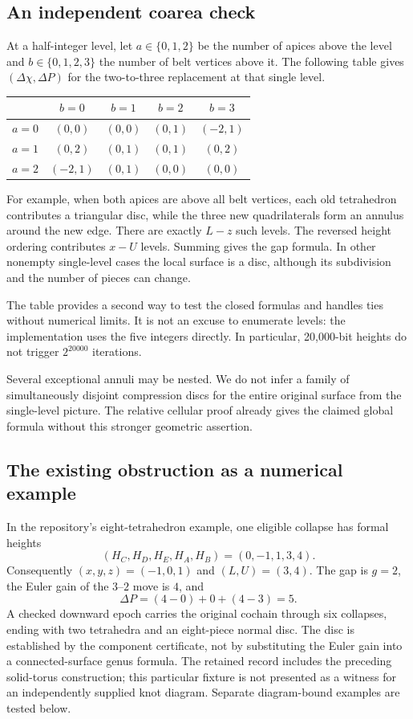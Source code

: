 \documentclass[11pt,letterpaper]{article}
\theoremstyle{definition}
\theoremstyle{remark}
\begin{document}
\subsection{An independent coarea check}

At a half-integer level, let $a\in\{0,1,2\}$ be the number of apices
above the level and $b\in\{0,1,2,3\}$ the number of belt vertices above it.
The following table gives $(\Delta\chi,\Delta P)$ for the two-to-three
replacement at that single level.

\begin{center}
\begin{tabular}{c@{\quad}cccc}
\toprule
 & $b=0$ & $b=1$ & $b=2$ & $b=3$\\
\midrule
$a=0$ & $(0,0)$ & $(0,0)$ & $(0,1)$ & $(-2,1)$\\
$a=1$ & $(0,2)$ & $(0,1)$ & $(0,1)$ & $(0,2)$\\
$a=2$ & $(-2,1)$ & $(0,1)$ & $(0,0)$ & $(0,0)$\\
\bottomrule
\end{tabular}
\end{center}

For example, when both apices are above all belt vertices, each old
tetrahedron contributes a triangular disc, while the three new quadrilaterals
form an annulus around the new edge. There are exactly $L-z$ such levels.
The reversed height ordering contributes $x-U$ levels. Summing gives the
gap formula. In other nonempty single-level cases the local surface is a
disc, although its subdivision and the number of pieces can change.

The table provides a second way to test the closed formulas and handles
ties without numerical limits. It is not an excuse to enumerate levels:
the implementation uses the five integers directly. In particular,
20,000-bit heights do not trigger $2^{20000}$ iterations.

Several exceptional annuli may be nested. We do not infer a family of
simultaneously disjoint compression discs for the entire original surface
from the single-level picture. The relative cellular proof already gives
the claimed global formula without this stronger geometric assertion.

\subsection{The existing obstruction as a numerical example}

In the repository's eight-tetrahedron example, one eligible collapse has
formal heights
\[
 (H_C,H_D,H_E,H_A,H_B)=(0,-1,1,3,4).
\]
Consequently $(x,y,z)=(-1,0,1)$ and $(L,U)=(3,4)$.
The gap is $g=2$, the Euler gain of the $3$--$2$ move is $4$, and
\[
 \Delta P=(4-0)+0+(4-3)=5.
\]
A checked downward epoch carries the original cochain through six
collapses, ending with two tetrahedra and an eight-piece normal disc.
The disc is established by the component certificate, not by substituting
the Euler gain into a connected-surface genus formula. The retained
record includes the preceding solid-torus construction; this particular
fixture is not presented as a witness for an independently supplied knot
diagram. Separate diagram-bound examples are tested below.
\end{document}
